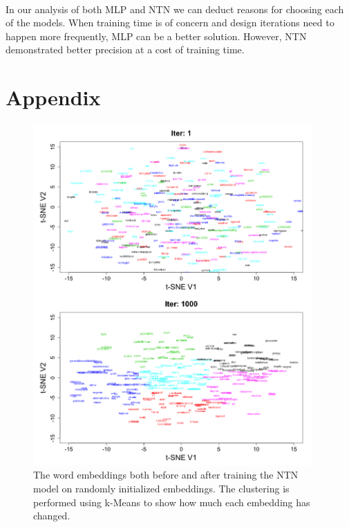 \documentclass[11.5pt]{article}
\newcounter{graphics}
\begin{document}
\paragraph{} In our analysis of both MLP and NTN we can deduct reasons for choosing each of the models. When training time is of concern and design iterations need to happen more frequently, MLP can be a better solution. However, NTN demonstrated better precision at a cost of training time.

\pagebreak

{}

\pagebreak
\section*{Appendix}
\begin{figure}[h!]
\centerline{\includegraphics[width=0.95\textwidth]{report_ntn/FirstLast-tSNE.png}}
  \caption{\small  The word embeddings both before and after training the NTN model on randomly initialized embeddings. The clustering is performed using k-Means to show how much each embedding has changed. }
\label{tSNE}
\end{figure}
\end{document}
